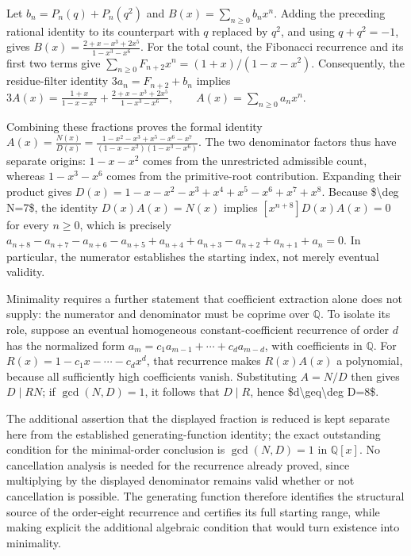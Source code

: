 \documentclass[11pt]{article}
\begin{document}
Let $b_n=P_n(q)+P_n(q^2)$ and $B(x)=\sum_{n\geq0}b_nx^n$. Adding the preceding rational identity to its counterpart with $q$ replaced by $q^2$, and using $q+q^2=-1$, gives
$B(x)=\frac{2+x-x^3+2x^5}{1-x^3-x^6}.$
For the total count, the Fibonacci recurrence and its first two terms give $\sum_{n\geq0}F_{n+2}x^n=(1+x)/(1-x-x^2)$. Consequently, the residue-filter identity $3a_n=F_{n+2}+b_n$ implies
$3A(x)=\frac{1+x}{1-x-x^2}+\frac{2+x-x^3+2x^5}{1-x^3-x^6},\qquad A(x)=\sum_{n\geq0}a_nx^n.$

Combining these fractions proves the formal identity
$A(x)=\frac{N(x)}{D(x)}=\frac{1-x^2-x^3+x^5-x^6-x^7}{(1-x-x^2)(1-x^3-x^6)}.$
The two denominator factors thus have separate origins: $1-x-x^2$ comes from the unrestricted admissible count, whereas $1-x^3-x^6$ comes from the primitive-root contribution. Expanding their product gives $D(x)=1-x-x^2-x^3+x^4+x^5-x^6+x^7+x^8$. Because \$\textbackslash{}deg N=7\$, the identity $D(x)A(x)=N(x)$ implies $[x^{n+8}]D(x)A(x)=0$ for every $n\geq0$, which is precisely
$a_{n+8}-a_{n+7}-a_{n+6}-a_{n+5}+a_{n+4}+a_{n+3}-a_{n+2}+a_{n+1}+a_n=0.$
In particular, the numerator establishes the starting index, not merely eventual validity.

Minimality requires a further statement that coefficient extraction alone does not supply: the numerator and denominator must be coprime over $\mathbb{Q}$. To isolate its role, suppose an eventual homogeneous constant-coefficient recurrence of order $d$ has the normalized form $a_m=c_1a_{m-1}+\cdots+c_da_{m-d}$, with coefficients in $\mathbb{Q}$. For $R(x)=1-c_1x-\cdots-c_dx^d$, that recurrence makes $R(x)A(x)$ a polynomial, because all sufficiently high coefficients vanish. Substituting $A=N/D$ then gives $D\mid RN$; if $\gcd(N,D)=1$, it follows that $D\mid R$, hence \$d\textbackslash{}geq\textbackslash{}deg D=8\$.

The additional assertion that the displayed fraction is reduced is kept separate here from the established generating-function identity; the exact outstanding condition for the minimal-order conclusion is $\gcd(N,D)=1$ in $\mathbb{Q}[x]$. No cancellation analysis is needed for the recurrence already proved, since multiplying by the displayed denominator remains valid whether or not cancellation is possible. The generating function therefore identifies the structural source of the order-eight recurrence and certifies its full starting range, while making explicit the additional algebraic condition that would turn existence into minimality.
\end{document}
